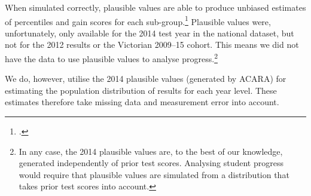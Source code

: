 When simulated correctly, plausible values are able to produce unbiased estimates of percentiles and gain scores for each sub-group.\footcite{wu2005} Plausible values were, unfortunately, only available for the 2014 test year in the national dataset, but not for the 2012 results or the Victorian 2009--15 cohort. This means we did not have the data to use plausible values to analyse progress.\footnote{In any case, the 2014 plausible values are, to the best of our knowledge, generated independently of prior test scores. Analysing student progress would require that plausible values are simulated from a distribution that takes prior test scores into account.}

We do, however, utilise the 2014 plausible values (generated by ACARA) for estimating the population distribution of results for each year level. These estimates therefore take missing data and measurement error into account. 